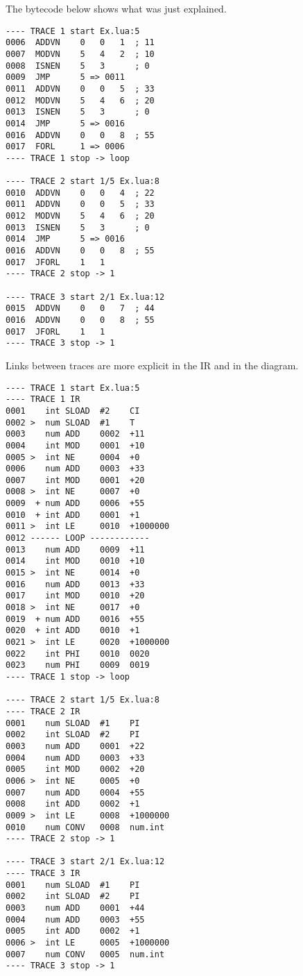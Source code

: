 The bytecode below shows what was just explained.

\begin{multicols}{2}
\begin{lstlisting}[style=DumpStyle]
---- TRACE 1 start Ex.lua:5
0006  ADDVN    0   0   1  ; 11
0007  MODVN    5   4   2  ; 10
0008  ISNEN    5   3      ; 0
0009  JMP      5 => 0011
0011  ADDVN    0   0   5  ; 33
0012  MODVN    5   4   6  ; 20
0013  ISNEN    5   3      ; 0
0014  JMP      5 => 0016
0016  ADDVN    0   0   8  ; 55
0017  FORL     1 => 0006
---- TRACE 1 stop -> loop

---- TRACE 2 start 1/5 Ex.lua:8
0010  ADDVN    0   0   4  ; 22
0011  ADDVN    0   0   5  ; 33
0012  MODVN    5   4   6  ; 20
0013  ISNEN    5   3      ; 0
0014  JMP      5 => 0016
0016  ADDVN    0   0   8  ; 55
0017  JFORL    1   1
---- TRACE 2 stop -> 1

---- TRACE 3 start 2/1 Ex.lua:12
0015  ADDVN    0   0   7  ; 44
0016  ADDVN    0   0   8  ; 55
0017  JFORL    1   1
---- TRACE 3 stop -> 1
\end{lstlisting}
\end{multicols}

\noindent
Links between traces are more explicit in the IR and in the diagram.

\begin{multicols}{2}
\begin{lstlisting}[style=DumpStyle]
---- TRACE 1 start Ex.lua:5
---- TRACE 1 IR
0001    int SLOAD  #2    CI
0002 >  num SLOAD  #1    T
0003    num ADD    0002  +11 
0004    int MOD    0001  +10 
0005 >  int NE     0004  +0  
0006    num ADD    0003  +33 
0007    int MOD    0001  +20 
0008 >  int NE     0007  +0  
0009  + num ADD    0006  +55 
0010  + int ADD    0001  +1  
0011 >  int LE     0010  +1000000
0012 ------ LOOP ------------
0013    num ADD    0009  +11 
0014    int MOD    0010  +10 
0015 >  int NE     0014  +0  
0016    num ADD    0013  +33 
0017    int MOD    0010  +20 
0018 >  int NE     0017  +0  
0019  + num ADD    0016  +55 
0020  + int ADD    0010  +1  
0021 >  int LE     0020  +1000000
0022    int PHI    0010  0020
0023    num PHI    0009  0019
---- TRACE 1 stop -> loop

---- TRACE 2 start 1/5 Ex.lua:8
---- TRACE 2 IR
0001    num SLOAD  #1    PI
0002    int SLOAD  #2    PI
0003    num ADD    0001  +22 
0004    num ADD    0003  +33 
0005    int MOD    0002  +20 
0006 >  int NE     0005  +0  
0007    num ADD    0004  +55 
0008    int ADD    0002  +1  
0009 >  int LE     0008  +1000000
0010    num CONV   0008  num.int
---- TRACE 2 stop -> 1

---- TRACE 3 start 2/1 Ex.lua:12
---- TRACE 3 IR
0001    num SLOAD  #1    PI
0002    int SLOAD  #2    PI
0003    num ADD    0001  +44 
0004    num ADD    0003  +55 
0005    int ADD    0002  +1  
0006 >  int LE     0005  +1000000
0007    num CONV   0005  num.int
---- TRACE 3 stop -> 1
\end{lstlisting}
\end{multicols}

